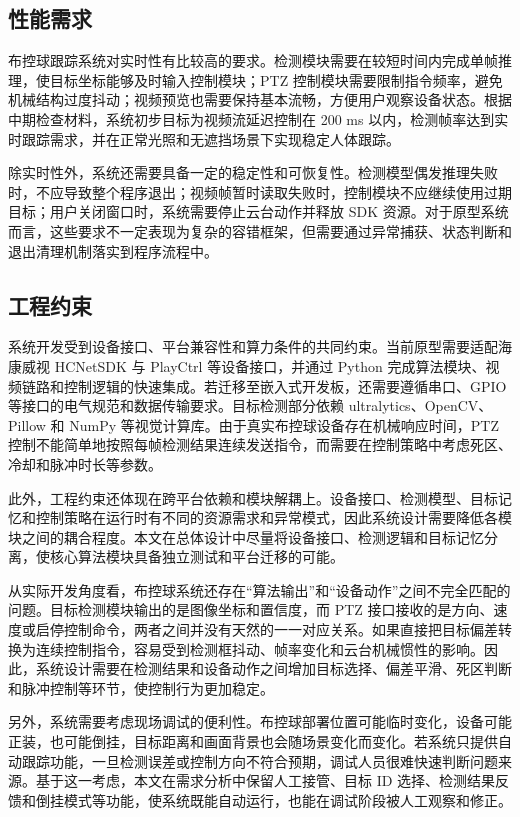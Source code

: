 \subsection{性能需求}

布控球跟踪系统对实时性有比较高的要求。检测模块需要在较短时间内完成单帧推理，使目标坐标能够及时输入控制模块；PTZ 控制模块需要限制指令频率，避免机械结构过度抖动；视频预览也需要保持基本流畅，方便用户观察设备状态。根据中期检查材料，系统初步目标为视频流延迟控制在 200 ms 以内，检测帧率达到实时跟踪需求，并在正常光照和无遮挡场景下实现稳定人体跟踪。

除实时性外，系统还需要具备一定的稳定性和可恢复性。检测模型偶发推理失败时，不应导致整个程序退出；视频帧暂时读取失败时，控制模块不应继续使用过期目标；用户关闭窗口时，系统需要停止云台动作并释放 SDK 资源。对于原型系统而言，这些要求不一定表现为复杂的容错框架，但需要通过异常捕获、状态判断和退出清理机制落实到程序流程中。

\subsection{工程约束}

系统开发受到设备接口、平台兼容性和算力条件的共同约束。当前原型需要适配海康威视 HCNetSDK 与 PlayCtrl 等设备接口，并通过 Python 完成算法模块、视频链路和控制逻辑的快速集成。若迁移至嵌入式开发板，还需要遵循串口、GPIO 等接口的电气规范和数据传输要求\cite{texas_gpio_2016}。目标检测部分依赖 ultralytics、OpenCV、Pillow 和 NumPy 等视觉计算库。由于真实布控球设备存在机械响应时间，PTZ 控制不能简单地按照每帧检测结果连续发送指令，而需要在控制策略中考虑死区、冷却和脉冲时长等参数。

此外，工程约束还体现在跨平台依赖和模块解耦上。设备接口、检测模型、目标记忆和控制策略在运行时有不同的资源需求和异常模式，因此系统设计需要降低各模块之间的耦合程度。本文在总体设计中尽量将设备接口、检测逻辑和目标记忆分离，使核心算法模块具备独立测试和平台迁移的可能。

从实际开发角度看，布控球系统还存在“算法输出”和“设备动作”之间不完全匹配的问题。目标检测模块输出的是图像坐标和置信度，而 PTZ 接口接收的是方向、速度或启停控制命令，两者之间并没有天然的一一对应关系。如果直接把目标偏差转换为连续控制指令，容易受到检测框抖动、帧率变化和云台机械惯性的影响。因此，系统设计需要在检测结果和设备动作之间增加目标选择、偏差平滑、死区判断和脉冲控制等环节，使控制行为更加稳定。

另外，系统需要考虑现场调试的便利性。布控球部署位置可能临时变化，设备可能正装，也可能倒挂，目标距离和画面背景也会随场景变化而变化。若系统只提供自动跟踪功能，一旦检测误差或控制方向不符合预期，调试人员很难快速判断问题来源。基于这一考虑，本文在需求分析中保留人工接管、目标 ID 选择、检测结果反馈和倒挂模式等功能，使系统既能自动运行，也能在调试阶段被人工观察和修正。

